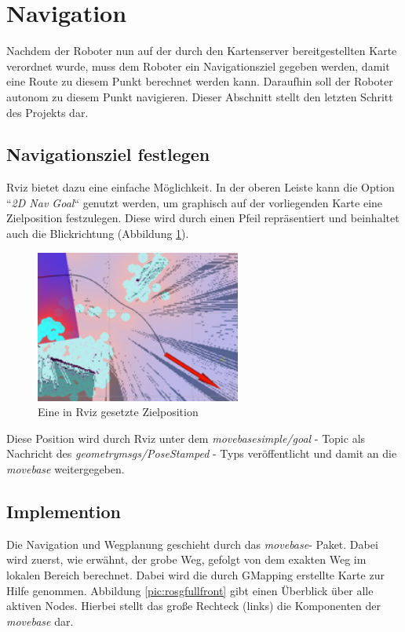 \section{Navigation}
{	
		Nachdem der Roboter nun auf der durch den Kartenserver bereitgestellten Karte verordnet wurde, muss dem Roboter ein Navigationsziel gegeben werden, damit eine Route zu diesem Punkt berechnet werden kann. Daraufhin soll der Roboter autonom zu diesem Punkt navigieren. Dieser Abschnitt stellt den letzten Schritt des Projekts dar.
		
		\subsection{Navigationsziel festlegen}
		{
			Rviz bietet dazu eine einfache Möglichkeit. In der oberen Leiste kann die Option ``\emph{2D Nav Goal}`` genutzt werden, um graphisch auf der vorliegenden Karte eine Zielposition festzulegen. Diese wird durch einen Pfeil repräsentiert und beinhaltet auch die Blickrichtung (Abbildung \ref{pic:rviznavgoalsmall}).
			\begin{figure}[b]
				\centering
				\includegraphics[height=5cm]{Bilder/rviz_navgoal_small.png}
				\caption{Eine in Rviz gesetzte Zielposition} 
				\label{pic:rviznavgoalsmall}
			\end{figure}
		Diese Position wird durch Rviz unter dem \emph{move\textunderscore base\textunderscore simple/goal} - Topic als Nachricht des  \emph{geometry\textunderscore msgs/PoseStamped} - Typs veröffentlicht und damit an die \emph{move\textunderscore base} weitergegeben.
		}
	
		\subsection{Implemention}
		{
			
			
			Die Navigation und Wegplanung geschieht durch das \emph{move\tus base}- Paket. Dabei wird zuerst, wie erwähnt, der grobe Weg, gefolgt von dem exakten Weg im lokalen Bereich berechnet. Dabei wird die durch GMapping erstellte Karte zur Hilfe genommen. Abbildung \ref{pic:rosgfullfront}  gibt einen Überblick über alle aktiven Nodes. Hierbei stellt das große Rechteck (links) die Komponenten der \emph{move\tus base} dar.
			

}}
